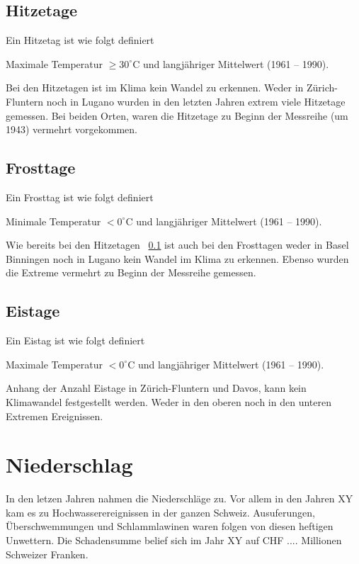 \begin{refsection}
\subsection{Hitzetage} \label{Hitzetage}

Ein Hitzetag ist wie folgt definiert

\begin{definition}
Maximale Temperatur $\ge 30^{\circ}$C und langjähriger Mittelwert (1961 -- 1990).
\end{definition}

Bei den Hitzetagen ist im Klima kein Wandel zu erkennen. Weder in Zürich-Fluntern noch in Lugano wurden in den letzten Jahren extrem viele Hitzetage gemessen. Bei beiden Orten, waren die Hitzetage zu Beginn der Messreihe (um 1943) vermehrt vorgekommen.


\subsection{Frosttage}
Ein Frosttag ist wie folgt definiert

\begin{definition}
Minimale Temperatur $< 0^{\circ}$C und langjähriger Mittelwert (1961 -- 1990).
\end{definition}

Wie bereits bei den Hitzetagen ~\ref{Hitzetage}  ist auch bei den Frosttagen weder in Basel Binningen noch in Lugano kein Wandel im Klima zu erkennen. Ebenso wurden die Extreme vermehrt zu Beginn der Messreihe gemessen.


\subsection{Eistage}
Ein Eistag ist wie folgt definiert

\begin{definition}
Maximale Temperatur $< 0^{\circ}$C und langjähriger Mittelwert (1961 -- 1990).
\end{definition}

Anhang der Anzahl Eistage in Zürich-Fluntern und Davos, kann kein Klimawandel festgestellt werden. Weder in den oberen noch in den unteren Extremen Ereignissen.


\section{Niederschlag}
In den letzen Jahren nahmen die Niederschläge zu. Vor allem in den Jahren XY kam es zu Hochwasserereignissen in der ganzen Schweiz. Ausuferungen, Überschwemmungen und Schlammlawinen waren folgen von diesen heftigen Unwettern. Die Schadensumme belief sich im Jahr XY auf CHF .... Millionen Schweizer Franken. 


\end{refsection}
